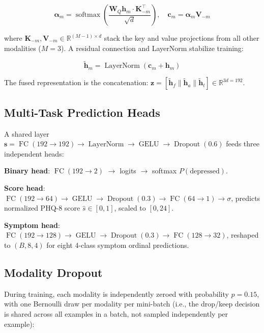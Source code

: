\documentclass[5p,twocolumn]{elsarticle}
\begin{document}
\begin{equation}
\boldsymbol{\alpha}_m =
  \operatorname{softmax}\!\!\left(\frac{\mathbf{W}_Q\mathbf{h}_m\cdot
  \mathbf{K}_{-m}^\top}{\sqrt{d}}\right),
\quad
\mathbf{c}_m = \boldsymbol{\alpha}_m \mathbf{V}_{-m}
\label{eq:attention}
\end{equation}

where $\mathbf{K}_{-m},\mathbf{V}_{-m}\in\mathbb{R}^{(M-1)\times d}$
stack the key and value projections from all other modalities
($M=3$). A residual connection and LayerNorm stabilize training:

\begin{equation}
\tilde{\mathbf{h}}_m = \operatorname{LayerNorm}(\mathbf{c}_m + \mathbf{h}_m)
\label{eq:residual}
\end{equation}

The fused representation is the concatenation:
$\mathbf{z} = [\tilde{\mathbf{h}}_f \| \tilde{\mathbf{h}}_a \|
\tilde{\mathbf{h}}_t] \in \mathbb{R}^{3d=192}$.

\subsection{Multi-Task Prediction Heads}

A shared layer $\mathbf{s}=\operatorname{FC}(192\!\to\!192)
\to\operatorname{LayerNorm}\to\operatorname{GELU}\to\operatorname{Dropout}(0.6)$
feeds three independent heads:

\textbf{Binary head}: $\operatorname{FC}(192\!\to\!2)$ $\to$ logits
$\to$ softmax $P(\text{depressed})$.

\textbf{Score head}: $\operatorname{FC}(192\!\to\!64)
\to\operatorname{GELU}\to\operatorname{Dropout}(0.3)
\to\operatorname{FC}(64\!\to\!1)\to\sigma$,
predicts normalized PHQ-8 score $\hat{s}\in[0,1]$, scaled to $[0,24]$.

\textbf{Symptom head}: $\operatorname{FC}(192\!\to\!128)
\to\operatorname{GELU}\to\operatorname{Dropout}(0.3)
\to\operatorname{FC}(128\!\to\!32)$, reshaped to $(B,8,4)$
for eight 4-class symptom ordinal predictions.

\subsection{Modality Dropout}

During training, each modality is independently zeroed with
probability $p=0.15$, with one Bernoulli draw per modality per
mini-batch (i.e., the drop/keep decision is shared across all
examples in a batch, not sampled independently per example):
\end{document}
